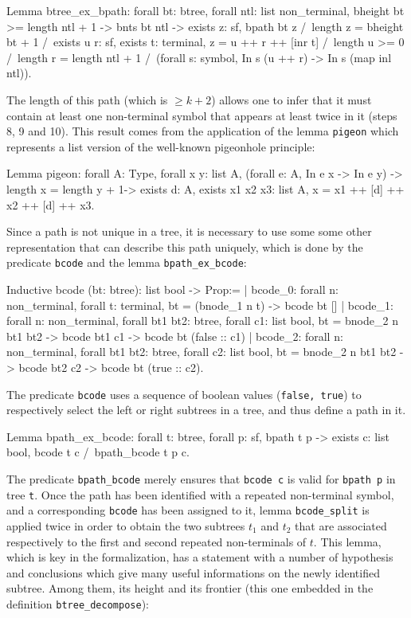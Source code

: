 \documentclass {elsarticle}
\begin{document}
\begin{coq}
Lemma btree_ex_bpath:
forall bt: btree,
forall ntl: list non_terminal,
bheight bt >= length ntl + 1 ->
bnts bt ntl ->
exists z: sf,
bpath bt z /\
length z = bheight bt + 1 /\
exists u r: sf,
exists t: terminal,
z = u ++ r ++ [inr t] /\
length u >= 0 /\
length r = length ntl + 1 /\
(forall s: symbol, In s (u ++ r) -> In s (map inl ntl)).
\end{coq}

The length of this path (which is $\ge k + 2$) allows one to infer that it must contain at least one non-terminal symbol that appears at least twice in it (steps 8, 9 and 10). This result comes from the application of the lemma \texttt {pigeon} which represents a list version of the well-known pigeonhole principle:

\begin{coq}
Lemma pigeon:
forall A: Type,
forall x y: list A,
(forall e: A, In e x -> In e y) ->
length x = length y + 1->
exists d: A,
exists x1 x2 x3: list A,
x = x1 ++ [d] ++ x2 ++ [d] ++ x3.
\end{coq}

Since a path is not unique in a tree, it is necessary to use some some other representation that can describe this path uniquely, which is done by the predicate \texttt {bcode} and the lemma \texttt {bpath\_ex\_bcode}:

\begin{coq}
Inductive bcode (bt: btree): list bool -> Prop:=
| bcode_0: forall n: non_terminal,
           forall t: terminal,
           bt = (bnode_1 n t) -> bcode bt []
| bcode_1: forall n: non_terminal,
           forall bt1 bt2: btree,
           forall c1: list bool,
           bt = bnode_2 n bt1 bt2 -> bcode bt1 c1 -> bcode bt (false :: c1)
| bcode_2: forall n: non_terminal,
           forall bt1 bt2: btree,
           forall c2: list bool,
           bt = bnode_2 n bt1 bt2 -> bcode bt2 c2 -> bcode bt (true :: c2).
\end{coq}

The predicate \texttt {bcode} uses a sequence of boolean values (\texttt {false, true}) to respectively select the left or right subtrees in a tree, and thus define a path in it.

\begin{coq}
Lemma bpath_ex_bcode:
forall t: btree,
forall p: sf,
bpath t p -> 
exists c: list bool,
bcode t c /\
bpath_bcode t p c.
\end{coq}

The predicate \texttt {bpath\_bcode} merely ensures that \texttt {bcode c} is valid for \texttt {bpath p} in tree \texttt {t}. Once the path has been identified with a repeated non-terminal symbol, and a corresponding \texttt {bcode} has been assigned to it, lemma \texttt {bcode\_split} is applied twice in order to obtain the two subtrees $t_1$ and $t_2$ that are associated respectively to the first and second repeated non-terminals of $t$. This lemma, which is key in the formalization, has a statement with a number of hypothesis and conclusions which give many useful informations on the newly identified subtree. Among them, its height and its frontier (this one embedded in the definition \texttt {btree\_decompose}):
\end{document}
